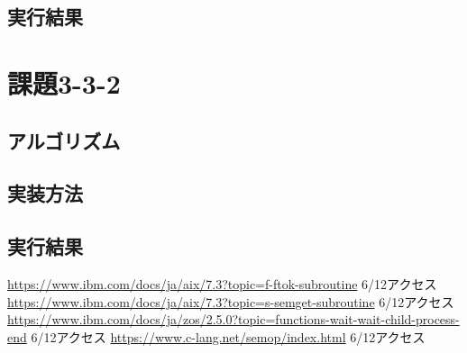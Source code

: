 \documentclass[dvipdfmx]{jarticle}
\begin{document}
\subsection{実行結果}
\section{課題3-3-2}
\subsection{アルゴリズム}

\subsection{実装方法}

\subsection{実行結果}
\begin{thebibliography}{99}
     \url{https://www.ibm.com/docs/ja/aix/7.3?topic=f-ftok-subroutine} 6/12アクセス
     \url{https://www.ibm.com/docs/ja/aix/7.3?topic=s-semget-subroutine} 6/12アクセス
     \url{https://www.ibm.com/docs/ja/zos/2.5.0?topic=functions-wait-wait-child-process-end} 6/12アクセス
     \url{https://www.c-lang.net/semop/index.html} 6/12アクセス
\end{thebibliography}
\end{document}
